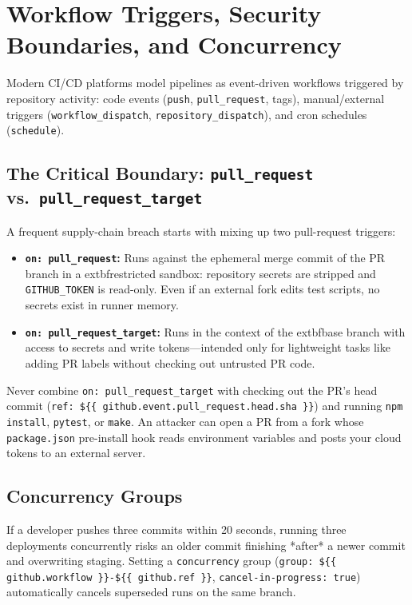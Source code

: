\section{Workflow Triggers, Security Boundaries, and Concurrency}

Modern CI/CD platforms model pipelines as event-driven workflows triggered by repository activity: code events (\texttt{push}, \texttt{pull\_request}, tags), manual/external triggers (\texttt{workflow\_dispatch}, \texttt{repository\_dispatch}), and cron schedules (\texttt{schedule}).

\subsection{The Critical Boundary: \texttt{pull\_request} vs.\ \texttt{pull\_request\_target}}
A frequent supply-chain breach starts with mixing up two pull-request triggers:
\begin{itemize}[leftmargin=12pt]
  \item \textbf{\texttt{on: pull\_request}:} Runs against the ephemeral merge commit of the PR branch in a 	extbf{restricted sandbox}: repository secrets are stripped and \texttt{GITHUB\_TOKEN} is read-only. Even if an external fork edits test scripts, no secrets exist in runner memory.
  \item \textbf{\texttt{on: pull\_request\_target}:} Runs in the context of the 	extbf{base branch} with access to secrets and write tokens—intended only for lightweight tasks like adding PR labels without checking out untrusted PR code.
\end{itemize}

\begin{productionwarningbox}
Never combine \texttt{on: pull\_request\_target} with checking out the PR's head commit (\texttt{ref: \$\{\{ github.event.pull\_request.head.sha \}\}}) and running \texttt{npm install}, \texttt{pytest}, or \texttt{make}. An attacker can open a PR from a fork whose \texttt{package.json} pre-install hook reads environment variables and posts your cloud tokens to an external server.
\end{productionwarningbox}

\subsection{Concurrency Groups}
If a developer pushes three commits within 20 seconds, running three deployments concurrently risks an older commit finishing *after* a newer commit and overwriting staging. Setting a \texttt{concurrency} group (\texttt{group: \$\{\{ github.workflow \}\}-\$\{\{ github.ref \}\}}, \texttt{cancel-in-progress: true}) automatically cancels superseded runs on the same branch.

